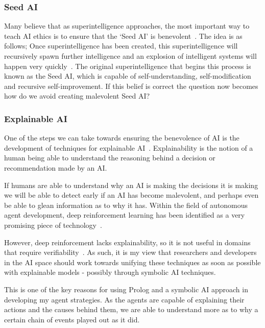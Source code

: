 \documentclass[]{final_report}
\begin{document}
\subsubsection{Seed AI}
Many believe that as superintelligence approaches, the most important way to teach AI ethics is to ensure that the `Seed AI' is benevolent~\cite{yudkowsky2001creating}. The idea is as follows; Once superintelligence has been created, this superintelligence will recursively spawn further intelligence and an explosion of intelligent systems will happen very quickly~\cite{good1966speculations}. The original superintelligence that begins this process is known as the Seed AI, which is capable of self-understanding, self-modification and recursive self-improvement. If this belief is correct the question now becomes how do we avoid creating malevolent Seed AI? 

\subsubsection{Explainable AI}
One of the steps we can take towards ensuring the benevolence of AI is the development of techniques for explainable AI~\cite{darpaxai}. Explainability is the notion of a human being able to understand the reasoning behind a decision or recommendation made by an AI.\par 
If humans are able to understand why an AI is making the decisions it is making we will be able to detect early if an AI has become malevolent, and perhaps even be able to glean information as to why it has. Within the field of autonomous agent development, deep reinforcement learning has been identified as a very promising piece of technology~\cite{mnih2013playing, mnih2016asynchronous}.\par 
However, deep reinforcement lacks explainability, so it is not useful in domains that require verifiability~\cite{garnelo2016towards}. As such, it is my view that researchers and developers in the AI space should work towards unifying these techniques as soon as possible with explainable models - possibly through symbolic AI techniques.\par 
This is one of the key reasons for using Prolog and a symbolic AI approach in developing my agent strategies. As the agents are capable of explaining their actions and the causes behind them, we are able to understand more as to why a certain chain of events played out as it did.
\end{document}

